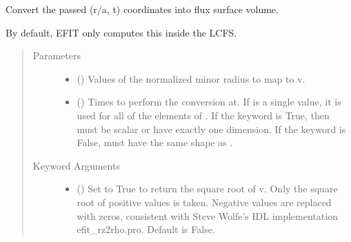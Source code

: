 \documentclass[letterpaper,10pt,english]{sphinxmanual}
\begin{document}
\begin{fulllineitems}
\begin{fulllineitems}
\end{fulllineitems}


\begin{fulllineitems}
\label{\detokenize{eqtools:eqtools.core.Equilibrium.roa2v}}
Convert the passed (r/a, t) coordinates into flux surface volume.

By default, EFIT only computes this inside the LCFS.
\begin{quote}\begin{description}
\item[{Parameters}] \leavevmode\begin{itemize}
\item {} 
 () \textendash{} Values of the normalized minor
radius to map to v.

\item {} 
 () \textendash{} Times to perform the conversion at.
If  is a single value, it is used for all of the elements of
. If the  keyword is True, then  must be scalar
or have exactly one dimension. If the  keyword is False,
 must have the same shape as .

\end{itemize}

\item[{Keyword Arguments}] \leavevmode\begin{itemize}
\item {} 
 () \textendash{} Set to True to return the square root of v.
Only the square root of positive values is taken. Negative
values are replaced with zeros, consistent with Steve Wolfe’s
IDL implementation efit\_rz2rho.pro. Default is False.


\end{itemize}
\end{description}
\end{quote}
\end{fulllineitems}
\end{fulllineitems}
\end{document}
